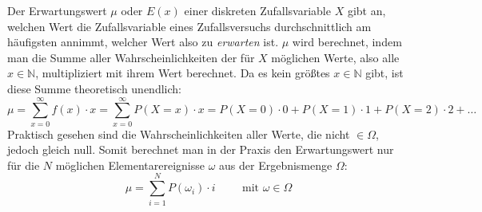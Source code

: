 \begin{figure}[h!]
	\centering
\end{figure}


Der Erwartungswert $\mu$ oder $E(x)$ einer diskreten Zufallsvariable $X$ gibt an, welchen Wert die Zufallsvariable eines Zufallsversuchs durchschnittlich am h\"{a}ufigsten annimmt, welcher Wert also zu \emph{erwarten} ist. $\mu$ wird berechnet, indem man die Summe aller Wahrscheinlichkeiten der f\"{u}r $X$ m\"{o}glichen Werte, also alle $x \in \mathbb{N}$, multipliziert mit ihrem Wert berechnet. Da es kein gr\"{o}\ss{}tes $x \in \mathbb{N}$ gibt, ist diese Summe theoretisch unendlich: $$\mu = \sum_{x=0}^{\infty} f(x) \cdot x = \sum_{x=0}^{\infty} P(X = x) \cdot x = P(X = 0) \cdot 0 + P(X = 1) \cdot 1 + P(X = 2) \cdot 2 + \dots$$ Praktisch gesehen sind die Wahrscheinlichkeiten aller Werte, die nicht $\in \Omega$, jedoch gleich null. Somit berechnet man in der Praxis den Erwartungswert nur f\"{u}r die $N$ m\"{o}glichen Elementarereignisse $\omega$ aus der Ergebnismenge $\Omega$: $$\mu = \sum_{i=1}^{N} P(\omega_i) \cdot i \hspace{1cm} \text{mit } \omega \in \Omega$$


